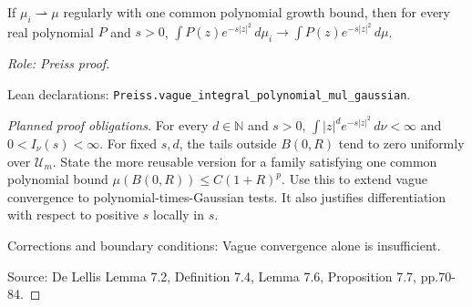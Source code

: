 \begin{lemma}
\label{lem:vague-gaussian-polynomials}







If $\mu_i\rightharpoonup\mu$ regularly with one common polynomial growth bound, then for every real polynomial $P$ and $s>0$, $\int P(z)e^{-s|z|^2}\,d\mu_i\to\int P(z)e^{-s|z|^2}\,d\mu$.
\par\emph{Role: Preiss proof.}
\par Lean declarations: \texttt{Preiss.vague\_integral\_polynomial\_mul\_gaussian}.
\end{lemma}
\begin{proof}[Planned proof obligations]

For every $d\in\mathbb N$ and $s>0$,
$\int |z|^d e^{-s|z|^2}\,d\nu<\infty$ and $0<I_\nu(s)<\infty$.
For fixed $s,d$, the tails outside $B(0,R)$ tend to zero uniformly over
$\mathcal U_m$. State the more reusable version for a family satisfying one
common polynomial bound $\mu(B(0,R))\leq C(1+R)^p$.
Use this to extend vague convergence to polynomial-times-Gaussian tests.
It also justifies differentiation with respect to positive $s$ locally in $s$.
\par Corrections and boundary conditions: Vague convergence alone is insufficient.
\par Source: De Lellis Lemma 7.2, Definition 7.4, Lemma 7.6, Proposition 7.7, pp.70-84.
\end{proof}

